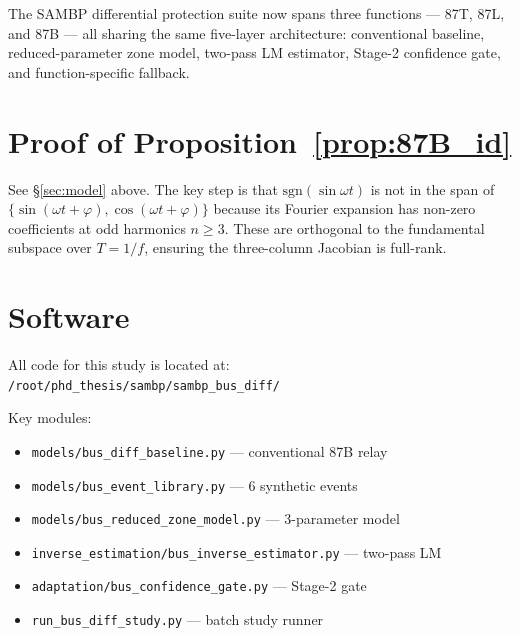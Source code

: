 \documentclass[12pt,a4paper]{article}
\begin{document}
The SAMBP differential protection suite now spans three functions — 87T, 87L,
and 87B — all sharing the same five-layer architecture: conventional baseline,
reduced-parameter zone model, two-pass LM estimator, Stage-2 confidence gate,
and function-specific fallback.



\appendix
\section{Proof of Proposition~\ref{prop:87B_id}}
\label{app:proof}

See \S\ref{sec:model} above.  The key step is that $\mathrm{sgn}(\sin\omega t)$
is not in the span of $\{\sin(\omega t + \varphi), \cos(\omega t + \varphi)\}$
because its Fourier expansion has non-zero coefficients at odd harmonics
$n \geq 3$.  These are orthogonal to the fundamental subspace over $T = 1/f$,
ensuring the three-column Jacobian is full-rank.

\section{Software}
\label{app:software}

All code for this study is located at:\\
\texttt{/root/phd\_thesis/sambp/sambp\_bus\_diff/}

\noindent Key modules:
\begin{itemize}
  \item \texttt{models/bus\_diff\_baseline.py} — conventional 87B relay
  \item \texttt{models/bus\_event\_library.py} — 6 synthetic events
  \item \texttt{models/bus\_reduced\_zone\_model.py} — 3-parameter model
  \item \texttt{inverse\_estimation/bus\_inverse\_estimator.py} — two-pass LM
  \item \texttt{adaptation/bus\_confidence\_gate.py} — Stage-2 gate
  \item \texttt{run\_bus\_diff\_study.py} — batch study runner
\end{itemize}
\end{document}
